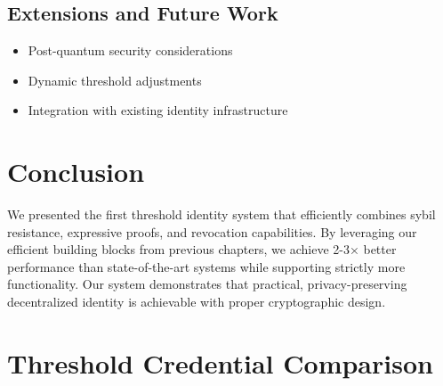 \subsection{Extensions and Future Work}
\begin{itemize}
    \item Post-quantum security considerations
    \item Dynamic threshold adjustments
    \item Integration with existing identity infrastructure
\end{itemize}

\section{Conclusion}
\label{sec:threshold-conclusion}

We presented the first threshold identity system that efficiently combines sybil resistance, expressive proofs, and revocation capabilities. By leveraging our efficient building blocks from previous chapters, we achieve 2-3× better performance than state-of-the-art systems while supporting strictly more functionality. Our system demonstrates that practical, privacy-preserving decentralized identity is achievable with proper cryptographic design.







\section{Threshold Credential Comparison}

